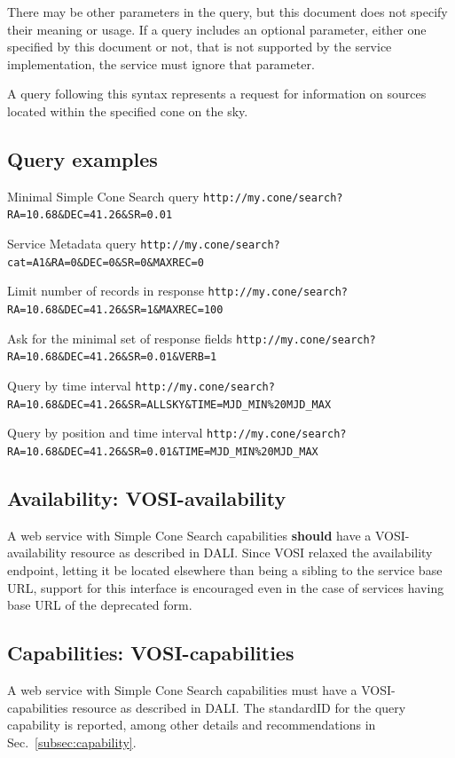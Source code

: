 \documentclass[11pt,a4paper]{ivoa}
\begin{document}
There may be other parameters in the query, but this document does not
specify their meaning or usage. If a query includes an optional
parameter, either one specified by this document or not, that is not
supported by the service implementation, the service must ignore that
parameter.

A query following this syntax represents a request for information on
sources located within the specified cone on the sky.

\subsection{Query examples} 

\begin{bigdescription} 
	\item[Minimal Simple Cone Search query]
		\nolinkurl{http://my.cone/search?RA=10.68\&DEC=41.26\&SR=0.01}
	\item[Service Metadata query]
		\nolinkurl{http://my.cone/search?cat=A1\&RA=0\&DEC=0\&SR=0\&MAXREC=0}
	\item[Limit number of records in response] 
		\nolinkurl{http://my.cone/search?RA=10.68\&DEC=41.26\&SR=1\&MAXREC=100}
	\item[Ask for the minimal set of response fields]
		\nolinkurl{http://my.cone/search?RA=10.68\&DEC=41.26\&SR=0.01\&VERB=1}
	\item[Query by time interval]
		\nolinkurl{http://my.cone/search?RA=10.68\&DEC=41.26\&SR=ALLSKY&TIME=MJD\_MIN\%20MJD\_MAX} 
	\item[Query by position and time interval]
		\nolinkurl{http://my.cone/search?RA=10.68\&DEC=41.26\&SR=0.01&TIME=MJD\_MIN\%20MJD\_MAX} 
\end{bigdescription}

\subsection{Availability: VOSI-availability} A web service with Simple
Cone Search capabilities \textbf{should} have a VOSI-availability
resource as described in DALI. Since VOSI relaxed the availability
endpoint, letting it be located elsewhere than being a sibling to the
service base URL, support for this interface is encouraged even in the
case of services having base URL of the deprecated form.

\subsection{Capabilities: VOSI-capabilities} A web service with Simple
Cone Search capabilities must have a VOSI-capabilities resource as
described in DALI. The standardID for the {query} capability is
reported, among other details and recommendations in
Sec.~\ref{subsec:capability}.
\end{document}
